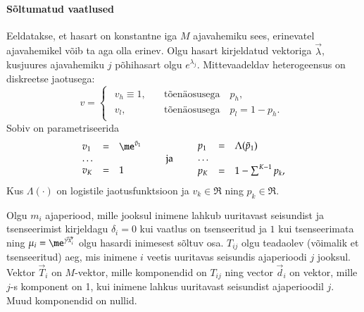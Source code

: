 \documentclass[a4paper]{article}
\numberwithin{equation}{subsection}
\begin{document}
\paragraph{Sõltumatud vaatlused}
Eeldatakse, et hasart on konstantne iga $M$ ajavahemiku sees,
erinevatel ajavahemikel võib ta aga olla erinev.  Olgu hasart
kirjeldatud vektoriga $\vec{\lambda}$, kusjuures ajavahemiku $j$
põhihasart olgu $e^{\lambda_j}$.  Mittevaadeldav heterogeensus on
diskreetse jaotusega:
\begin{equation}
v = \begin{cases}
  \begin{array}{ll}
  v_h \equiv 1,\quad &\mbox{tõenäosusega}\quad p_h,\\
  v_l,               &\mbox{tõenäosusega}\quad p_l = 1 - p_h.
  \end{array}
\end{cases}
\end{equation}
Sobiv on parametriseerida
\begin{equation}
  \begin{array}{lcl}
    v_1 & = & \me^{\tilde v_1}\\
    \ldots\\
    v_K & = & 1
  \end{array} 
  \qquad \mbox{ja} \qquad
  \begin{array}{lcl}
    p_1 & = & \Lambda(\tilde p_1)\\
    \ldots\\
    p_K & = & 1 - \sum^{K-1} p_k,
  \end{array}
\end{equation}
Kus $\Lambda(\cdot)$ on logistile jaotusfunktsioon ja $v_k \in \Re$
ning $p_k \in \Re$.

Olgu $m_i$ ajaperiood, mille jooksul inimene lahkub uuritavast
seisundist ja tsenseerimist kirjeldagu $\delta_i = 0$ kui vaatlus on
tsenseeritud ja $1$ kui tsenseerimata ning $\mu_i = \me^{\vec{\gamma}
\vec{x}_i'}$ olgu hasardi inimesest sõltuv osa.  $T_{ij}$ olgu
teadaolev (võimalik et tsenseeritud) aeg, mis inimene $i$ veetis
uuritavas seisundis ajaperioodi $j$ jooksul.  Vektor $\vec{T}_i$ on
$M$-vektor, mille komponendid on $T_{ij}$ ning vector $\vec{d}_i$ on
vektor, mille $j$-s komponent on 1, kui inimene lahkus uuritavast
seisundist ajaperioodil $j$.  Muud komponendid on nullid.
\end{document}
